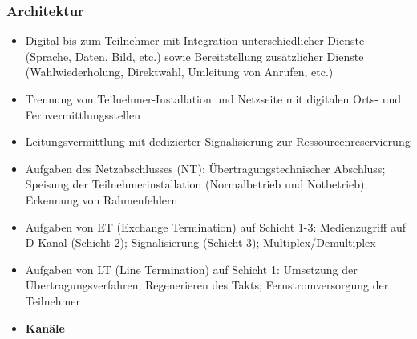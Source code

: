 \subsubsection{Architektur}
\begin{itemize}
	\item Digital bis zum Teilnehmer mit Integration unterschiedlicher Dienste (Sprache, Daten, Bild, etc.) sowie Bereitstellung zusätzlicher Dienste (Wahlwiederholung, Direktwahl, Umleitung von Anrufen, etc.)
	\item Trennung von Teilnehmer-Installation und Netzseite mit digitalen Orts- und Fernvermittlungsstellen
	\item Leitungsvermittlung mit dedizierter Signalisierung zur Ressourcenreservierung
	\item Aufgaben des Netzabschlusses (NT): Übertragungstechnischer Abschluss; Speisung der Teilnehmerinstallation (Normalbetrieb und Notbetrieb); Erkennung von Rahmenfehlern
	\item Aufgaben von ET (Exchange Termination) auf Schicht 1-3: Medienzugriff auf D-Kanal (Schicht 2); Signalisierung (Schicht 3); Multiplex/Demultiplex
	\item Aufgaben von LT (Line Termination) auf Schicht 1: Umsetzung der Übertragungsverfahren; Regenerieren des Takts; Fernstromversorgung der Teilnehmer
	\item \textbf{Kanäle}
\end{itemize}

